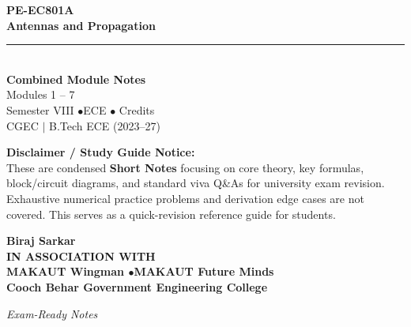 \documentclass[12pt,a4paper]{article}
\begin{document}
\thispagestyle{empty}


\vspace*{1.0cm}
\begin{center}
  {\Huge\bfseries\color{myred} PE-EC801A}\\[10pt]
  {\LARGE\bfseries\color{mydark} Antennas and Propagation}\\[20pt]
  {\color{myred}\rule{0.7\linewidth}{1.5pt}}\\[18pt]
  {\Large\color{myteal}\textbf{Combined Module Notes}}\\[8pt]
  {\large\color{mydark} Modules 1 -- 7}\\[40pt]
  {\normalsize\color{mydark} Semester VIII \quad$\bullet$\quad ECE \quad$\bullet$ Credits}\\[12pt]
  {\normalsize\color{mydark} CGEC \;$|$\; B.Tech ECE (2023--27)}
\end{center}
\vspace{1.0cm}
\begin{center}
  \begin{tcolorbox}[colback=mygray, colframe=mgframe, boxrule=0.5pt, arc=3pt, width=0.85\linewidth]
    \centering\small\color{mydark}
    \textbf{Disclaimer / Study Guide Notice:}\\
    These are condensed \textbf{Short Notes} focusing on core theory, key formulas, block/circuit diagrams, and standard viva Q\&As for university exam revision. Exhaustive numerical practice problems and derivation edge cases are not covered. This serves as a quick-revision reference guide for students.
  \end{tcolorbox}
\end{center}
\vfill
\vspace{0.6cm}
\begin{center}
  {\large\bfseries\color{mypurple} Biraj Sarkar}\\[16pt]
  {\footnotesize\color{watermark}\textbf{IN ASSOCIATION WITH}}\\[8pt]
  {\small\bfseries\color{mydark} MAKAUT Wingman \quad$\bullet$\quad MAKAUT Future Minds}\\[12pt]
  {\large\bfseries\color{myteal} Cooch Behar Government Engineering College}
\end{center}
\vfill
\begin{center}{\small\color{watermark}\textit{Exam-Ready Notes}}\end{center}
\clearpage
\end{document}
